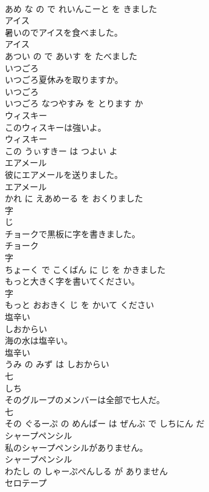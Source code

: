 \documentclass[8pt]{extreport}
\begin{document}
\begin{CJK}{UTF8}{min}
\\	あめ な の で れいんこーと を きました			
\\	アイス	
\\	暑いのでアイスを食べました。	
\\	アイス 
\\	あつい の で あいす を たべました			
\\	いつごろ	
\\	いつごろ夏休みを取りますか。	
\\	いつごろ 
\\	いつごろ なつやすみ を とります か			
\\	ウィスキー	
\\	このウィスキーは強いよ。	
\\	ウィスキー 
\\	この うぃすきー は つよい よ			
\\	エアメール	
\\	彼にエアメールを送りました。	
\\	エアメール 
\\	かれ に えあめーる を おくりました			
\\	字	
\\	じ			
\\	チョークで黒板に字を書きました。	
\\	チョーク 
\\	字 
\\	ちょーく で こくばん に じ を かきました			
\\	もっと大きく字を書いてください。	
\\	字 
\\	もっと おおきく じ を かいて ください			
\\	塩辛い	
\\	しおからい			
\\	海の水は塩辛い。	
\\	塩辛い 
\\	うみ の みず は しおからい			
\\	七	
\\	しち			
\\	そのグループのメンバーは全部で七人だ。	
\\	七 
\\	その ぐるーぷ の めんばー は ぜんぶ で しちにん だ			
\\	シャープペンシル	
\\	私のシャープペンシルがありません。	
\\	シャープペンシル 
\\	わたし の しゃーぷぺんしる が ありません			
\\	セロテープ	

\end{CJK}
\end{document}
